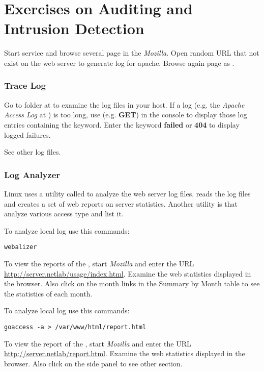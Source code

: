 \documentclass{../UTNetLab}
\begin{document}
\part{Exercises on Auditing and Intrusion Detection}
Start  service and browse several page in the \textit{Mozilla}.
Open random URL that not exist on the web server to generate log for apache.
Browse again page as .

\section{Trace Log}
Go to  folder at  to examine the log files in your host.
If a log (e.g. the \textit{Apache Access Log} at ) is too long, use  (e.g. \textbf{GET}) in the {console} to display those log entries containing the keyword.
Enter the keyword \textbf{failed} or \textbf{404} to display logged failures.

See other log files.

\section{Log Analyzer}
Linux uses a utility called  to analyze the web server log files.
 reads the  log files and creates a set of web reports on server statistics.
Another utility is  that analyze various access type and list it.

To analyze local log use this commands:
\begin{lstlisting}
webalizer
    \end{lstlisting}

To view the reports of the , start \textit{Mozilla} and enter the URL \url{http://server.netlab/usage/index.html}.
Examine the web statistics displayed in the browser.
Also click on the month links in the Summary by Month table to see the statistics of each month.

To analyze local log use this commands:
\begin{lstlisting}
goaccess -a > /var/www/html/report.html
    \end{lstlisting}

To view the report of the , start \textit{Mozilla} and enter the URL \url{http://server.netlab/report.html}.
Examine the web statistics displayed in the browser.
Also click on the side panel to see other section.
\end{document}
